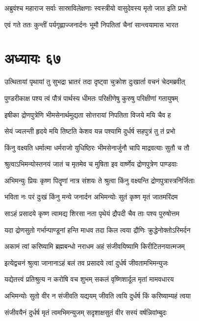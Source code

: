 \twolineshloka
{अब्रुवंश्च महाराज सर्वाः सास्राविलेक्षणाः}
{स्वस्त्रीयो वासुदेवस्य मृतो जात इति प्रभो}


\twolineshloka
{एवं गते ततः कुन्तीं पर्यगृह्णाज्जनार्दनः}
{भूमौ निपतितां चैनां सान्त्वयामास भारत}


\chapter{अध्यायः ६७}
\twolineshloka
{उत्थितायां पृथायां तु सुभद्रा भ्रातरं तदा}
{दृष्ट्वा चुक्रोश दुःखार्ता वचनं चेदमब्रवीत्}


\twolineshloka
{पुण्डरीकाक्ष पश्य त्वं पौत्रं पार्थस्य धीमतः}
{परिक्षीणेषु कुरुषु परिक्षीणां गतायुषम्}


\twolineshloka
{इषीका द्रोणपुत्रेणि भीमसेनार्थमुद्यता}
{सोत्तरायां निपतिता विजये मयि चैव ह}


\twolineshloka
{सेयं ज्वलन्ती हृदये मयि तिष्टति केशव}
{यन्न पश्यामि दुर्धर्ष सहपुत्रं तु तं प्रभो}


\twolineshloka
{किंनु वक्ष्यति धर्मात्मा धर्मराजो युधिष्ठिरः}
{भीमसेनार्जुनौ चापि माद्रवत्याः सुतौ च तौ}


\twolineshloka
{श्रुत्वाऽभिमन्योस्तनयं जातं च मृतमेव च}
{मुषिता इव वार्ष्णेय द्रोणपुत्रेण पाण्डवाः}


\twolineshloka
{अभिमन्युः प्रियः कृष्ण पितॄणां नात्र संशयः}
{ते श्रुत्वा किंनु वक्ष्यन्ति द्रोणपुत्रास्त्रनिर्जिताः}


\twolineshloka
{भविता नः परं दुःखं किंनु मन्ये जनार्दन}
{अभिमन्योः सुतं कृष्ण मृतं जातमरिंदम}


\twolineshloka
{साऽहं प्रसादये कृष्ण त्वामद्य शिरसा नता}
{पृथेयं द्रौपदी चैव ताः पश्य पुरुषोत्तम}


\twolineshloka
{यदा द्रोणसुतो गर्भान्पाण्डूनां हन्ति माधव}
{तदा किल त्वया द्रौणिः क्रुद्धेनोक्तोऽरिमर्दन}


\twolineshloka
{अकामं त्वां करिष्यामि ब्रह्मबन्धो नराधम}
{अहं संजीवयिष्यामि किरीटितनयात्मजम्}


\twolineshloka
{इत्येद्वचनं श्रुत्वा जानानाऽहं बलं तव}
{प्रसादये त्वां दुर्धर्ष जीवतामभिमन्युजः}


\twolineshloka
{यद्येतत्त्वं प्रतिश्रुत्य न करोषि वच शुभम्}
{सकलं वृष्णिशार्दूल मृतां मामवधारय}


\twolineshloka
{अभिमन्योः सुतो वीर न संजीवति यद्ययम्}
{जीवति त्वयि दुर्धर्ष किं करिष्याम्यहं त्वया}


\twolineshloka
{संजीवयैनं दुर्धर्ष मृतं त्वमभिमन्युजम्}
{सदृशाक्षसुतं वीर सस्यं वर्षन्निवांम्बुदः}


